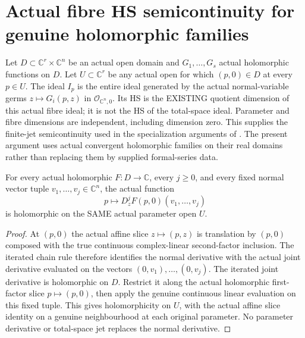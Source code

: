 \section{Actual fibre HS semicontinuity for genuine holomorphic families}

Let $D\subset\mathbb C^r\times\mathbb C^n$ be an actual open domain and
$G_1,\ldots,G_s$ actual holomorphic functions on $D$. Let
$U\subset\mathbb C^r$ be any actual open for which $(p,0)\in D$ at every
$p\in U$. The ideal $I_p$ is the entire ideal generated by the actual
normal-variable germs $z\mapsto G_i(p,z)$ in
$\mathcal O_{\mathbb C^n,0}$. Its HS is the EXISTING quotient dimension
of this actual fibre ideal; it is not the HS of the total-space ideal.
Parameter and fibre dimensions are independent, including dimension zero.
This supplies the finite-jet semicontinuity used in the specialization
arguments of \cite[Lemmas 7.25--7.26, pp.~270--271]{bierstone-milman97-invent-math}.
The present argument uses actual convergent holomorphic families on their
real domains rather than replacing them by supplied formal-series data.

\begin{lemma}
\label{hir:actual-independent-parameter-normal-derivative-holomorphic}
\leanok
{}
For every actual holomorphic $F:D\to\mathbb C$, every $j\ge0$, and every
fixed normal vector tuple $v_1,\ldots,v_j\in\mathbb C^n$, the actual
function
\[
 p\longmapsto D_z^j F(p,0)(v_1,\ldots,v_j)
\]
is holomorphic on the SAME actual parameter open $U$.
\end{lemma}
\begin{proof}
At $(p,0)$ the actual affine slice $z\mapsto(p,z)$ is translation by
$(p,0)$ composed with the true continuous complex-linear second-factor
inclusion. The iterated chain rule therefore identifies the normal
derivative with the actual joint derivative evaluated on the vectors
$(0,v_1),\ldots,(0,v_j)$. The iterated joint derivative is holomorphic
on $D$. Restrict it along the actual holomorphic first-factor slice
$p\mapsto(p,0)$, then apply the genuine continuous linear evaluation on
this fixed tuple. This gives holomorphicity on $U$, with the actual affine
slice identity on a genuine neighbourhood at each original parameter.
No parameter derivative or total-space jet replaces the normal derivative.
\end{proof}

